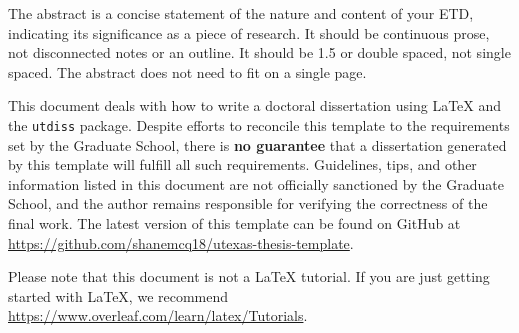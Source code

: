 The abstract is a concise statement of the nature and content of your ETD, indicating its significance as a piece of research.
It should be continuous prose, not disconnected notes or an outline.
It should be 1.5 or double spaced, not single spaced.
The abstract does not need to fit on a single page.

This document deals with how to write a doctoral dissertation using \LaTeX{} and the \texttt{utdiss} package.
Despite efforts to reconcile this template to the requirements set by the Graduate School, there is \textbf{no guarantee} that a dissertation generated by this template will fulfill all such requirements.
Guidelines, tips, and other information listed in this document are not officially sanctioned by the Graduate School, and the author remains responsible for verifying the correctness of the final work.
The latest version of this template can be found on GitHub at \url{https://github.com/shanemcq18/utexas-thesis-template}.

Please note that this document is not a \LaTeX{} tutorial.
If you are just getting started with \LaTeX{}, we recommend \url{https://www.overleaf.com/learn/latex/Tutorials}.
